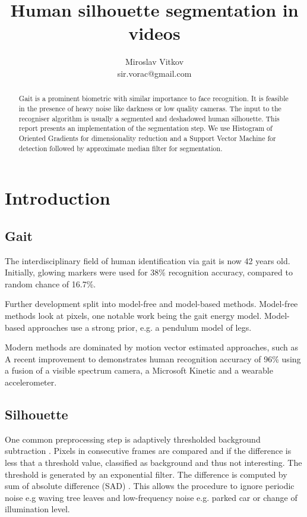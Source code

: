\documentclass{article}
\title{Human silhouette segmentation in videos}
\author{Miroslav Vitkov \\ sir.vorac@gmail.com}
\begin{document}
\maketitle


\begin{abstract}
Gait is a prominent biometric with similar importance to face recognition.
It is feasible in the presence of heavy noise like darkness or low quality cameras.
The input to the recogniser algorithm is usually a segmented and deshadowed human silhouette.
This report presents an implementation of the segmentation step.
We use Histogram of Oriented Gradients for dimensionality reduction and a Support Vector Machine for detection followed by approximate median filter for segmentation.
\end{abstract}


\section{Introduction}
\subsection{Gait}
The interdisciplinary field of human identification via gait is now 42 years old.
Initially, glowing markers were used\cite{begin} for 38\% recognition accuracy, compared to random chance of 16.7\%.

Further development split into model-free and model-based methods.
Model-free methods look at pixels, one notable work being the gait energy model\cite{energy}.
Model-based approaches use a strong prior, e.g. a pendulum model of legs\cite{pendulum}.

Modern methods are dominated by motion vector estimated approaches, such as \cite{pyramid}
A recent improvement to \cite{pyramid} demonstrates human recognition accuracy of 96\% using a fusion of a visible spectrum camera, a Microsoft Kinetic and a wearable accelerometer\cite{robust}.


\subsection{Silhouette}
One common preprocessing step is adaptively thresholded background subtraction \cite{vehicle}.
Pixels in consecutive frames are compared and if the difference is less that a threshold value, classified as background and thus not interesting.
The threshold is generated by an exponential filter.
The difference is computed by sum of absolute difference (SAD) \cite{background}.
This allows the procedure to ignore periodic noise e.g waving tree leaves and low-frequency noise e.g. parked car or change of illumination level.
\end{document}
